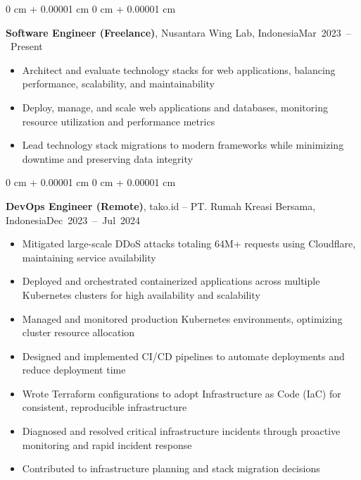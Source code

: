 \documentclass[10pt, a4paper]{article}
\newenvironment{highlights}{
    \begin{itemize}[
        topsep=0.10 cm,
        parsep=0.10 cm,
        partopsep=0pt,
        itemsep=0pt,
        leftmargin=0 cm + 10pt
    ]
}{
    \end{itemize}
} %
\newenvironment{onecolentry}{
    \begin{adjustwidth}{
        0 cm + 0.00001 cm
    }{
        0 cm + 0.00001 cm
    }
}{
    \end{adjustwidth}
} %
\newcommand{\entryheading}[2]{#1\hspace{0pt plus 1filll}\mbox{#2}\par}
\begin{document}
        \vspace{0.2 cm}

        \begin{onecolentry}
            \entryheading{\textbf{Software Engineer (Freelance)}, Nusantara Wing Lab, Indonesia}{Mar 2023 – Present}
            \begin{highlights}
                \item Architect and evaluate technology stacks for web applications, balancing performance, scalability, and maintainability
                \item Deploy, manage, and scale web applications and databases, monitoring resource utilization and performance metrics
                \item Lead technology stack migrations to modern frameworks while minimizing downtime and preserving data integrity
            \end{highlights}
        \end{onecolentry}

        \vspace{0.2 cm}

        \begin{onecolentry}
            \entryheading{\textbf{DevOps Engineer (Remote)}, tako.id -- PT. Rumah Kreasi Bersama, Indonesia}{Dec 2023 – Jul 2024}
            \begin{highlights}
                \item Mitigated large-scale DDoS attacks totaling 64M+ requests using Cloudflare, maintaining service availability
                \item Deployed and orchestrated containerized applications across multiple Kubernetes clusters for high availability and scalability
                \item Managed and monitored production Kubernetes environments, optimizing cluster resource allocation
                \item Designed and implemented CI/CD pipelines to automate deployments and reduce deployment time
                \item Wrote Terraform configurations to adopt Infrastructure as Code (IaC) for consistent, reproducible infrastructure
                \item Diagnosed and resolved critical infrastructure incidents through proactive monitoring and rapid incident response
                \item Contributed to infrastructure planning and stack migration decisions
            \end{highlights}
        \end{onecolentry}
\end{document}

